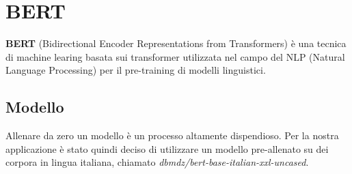 \documentclass[12pt]{article}
\begin{document}
\maketitle
\newcommand{\E}{È}




\section{BERT}
\textbf{BERT}\cite{bert} (Bidirectional Encoder Representations from Transformers) è una tecnica di machine learing basata sui transformer utilizzata nel campo del NLP (Natural Language Processing) per il pre-training di modelli linguistici.



\subsection{Modello}
Allenare da zero un modello è un processo altamente dispendioso. Per la nostra applicazione è stato quindi deciso di utilizzare un modello pre-allenato su dei corpora in lingua italiana, chiamato \textit{dbmdz/bert-base-italian-xxl-uncased}\cite{bert_it}.
\end{document}
